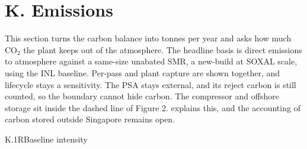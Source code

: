 \providecommand{\cBkAnnual}{44{,}476}
\providecommand{\cBkE}{3.77}
\providecommand{\cBkTerm}{3.19}
\providecommand{\cChoPct}{1.8}
\providecommand{\cChoProc}{6.08}
\providecommand{\cCmpAbate}{0.536}
\providecommand{\cEfeed}{5.97}
\providecommand{\cEst}{5.46}
\providecommand{\cIeaBase}{8.996}
\providecommand{\cIeaFuel}{14.2}
\providecommand{\cInlCcCap}{71.5}
\providecommand{\vAbAbove}{328{,}052}
\providecommand{\vAbAvA}{0.442}
\providecommand{\vAbAvB}{0.510}
\providecommand{\vAbAvC}{0.578}
\providecommand{\vAbAvD}{0.612}
\providecommand{\vAbBurden}{0.566}
\providecommand{\vAbCapEight}{0.564}
\providecommand{\vAbCapHigh}{0.584}
\providecommand{\vAbCapLow}{0.571}
\providecommand{\vAbCho}{0.587}
\providecommand{\vAbCombH}{0.467}
\providecommand{\vAbCombN}{0.357}
\providecommand{\vAbExport}{0.467}
\providecommand{\vAbIea}{0.564}
\providecommand{\vAbLife}{0.616}
\providecommand{\vAbSystem}{0.528}
\providecommand{\vAbateMt}{0.578}
\providecommand{\vBkCc}{29{,}017}
\providecommand{\vBkHours}{1{,}314}
\providecommand{\vBkHtwo}{11{,}810}
\providecommand{\vBkNo}{108{,}770}
\providecommand{\vEcapB}{359{,}777}
\providecommand{\vIntensity}{0.572}
\providecommand{\vReduction}{93.8}
\section{K. Emissions}\label{sec:K}
This section turns the carbon balance into tonnes per year and asks how much CO$_2$ the plant keeps out of the atmosphere. The headline basis is direct emissions to atmosphere against a same-size unabated SMR, a new-build at SOXAL scale, using the INL baseline. Per-pass and plant capture are shown together, and lifecycle stays a sensitivity. The PSA stays external, and its reject carbon is still counted, so the boundary cannot hide carbon. The compressor and offshore storage sit inside the dashed line of Figure 2.  explains this, and the accounting of carbon stored outside Singapore remains open.

\begin{eqcard}{K.1}{R}{Baseline intensity}
\end{eqcard}

